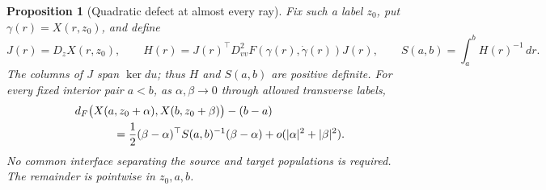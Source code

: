\documentclass[11pt,reqno]{amsart}
\newtheorem{proposition}[theorem]{Proposition}
\theoremstyle{definition}
\theoremstyle{remark}
\numberwithin{equation}{section}
\begin{document}
\begin{proposition}[Quadratic defect at almost every ray]
\label{prop:rough-ray-quadratic}
Fix such a label \(z_0\), put \(\gamma(r)=X(r,z_0)\), and define
\[
J(r)=D_zX(r,z_0),\qquad
H(r)=J(r)^\top D^2_{vv}F(\gamma(r),\dot\gamma(r))J(r),\qquad
S(a,b)=\int_a^b H(r)^{-1}\,dr.
\]
The columns of \(J\) span \(\ker du\); thus \(H\) and \(S(a,b)\)
are positive definite. For every fixed interior pair \(a<b\), as
\(\alpha,\beta\to0\) through allowed transverse labels,
\begin{align}
&d_F\bigl(X(a,z_0+\alpha),X(b,z_0+\beta)\bigr)-(b-a)
\notag\\
&\hspace{12mm}=
\frac12(\beta-\alpha)^\top S(a,b)^{-1}(\beta-\alpha)
+o(|\alpha|^2+|\beta|^2).
\label{eq:rough-ray-quadratic}
\end{align}
No common interface separating the source and target populations is
required. The remainder is pointwise in \(z_0,a,b\).
\end{proposition}
\end{document}
